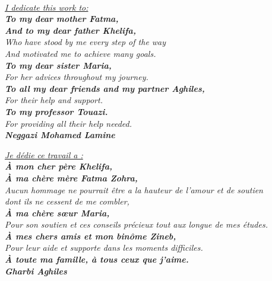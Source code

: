 \vspace*{0.1in}

\thispagestyle{empty}

\let\clearpage\relax

\begin{center}
    \textit{\fontsize{34}{46}{\bfseries{\color{Black}{Dedication}}}}
    \\
    \vspace{0.2in}
    \itshape
    \Large{\underline{I dedicate this work to:}}\\          \textbf{\large{To my dear mother Fatma,}}\\\vspace{-0.1in}
    \textbf{\large{And to my dear father Khelifa,}}\\
    \large{Who have stood by me every step of the way\\\vspace{-0.1in}And motivated me to achieve many goals.}\\
    \textbf{\large{To my dear sister Maria,}}\\
    \large{For her advices throughout my journey.}\\
    \textbf{\large{To all my dear friends and my partner Aghiles,}}\\
    \large{For their help and support.}\\
    \textbf{\large{To my professor Touazi.}}\\
    \large{For providing all their help needed.}\\
    \hfill\textbf{\Large{Neggazi Mohamed Lamine}}

    \vspace{0.4in}
    \itshape
    \Large{\underline{Je dédie ce travail a :}}\\          \textbf{\large{À mon cher père Khelifa,}}\\\vspace{-0.1in}
    \textbf{\large{À ma chère mère Fatma Zohra,}}\\
    \large{Aucun hommage ne pourrait être a la hauteur de l’amour et de soutien\\\vspace{-0.1in}dont ils ne cessent de me combler,}\\
    \textbf{\large{À ma chère sœur Maria,}}\\
    \large{Pour son soutien et ces conseils précieux tout aux longue de mes études.}\\
    \textbf{\large{À mes chers amis et mon binôme Zineb,}}\\
    \large{Pour leur aide et supporte dans les moments difficiles.}\\
    \textbf{\large{À toute ma famille, à tous ceux que j’aime.}}\\\vspace{0.1in}
    \hfill\textbf{\Large{Gharbi Aghiles}}

\end{center}


